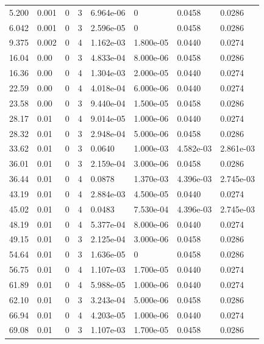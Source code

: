 \documentclass[preview]{standalone}
\begin{document}
{{\begin{tabular}{L{1.2cm}C{1.2cm} C{0.3cm}C{0.5cm} C{1.4cm}C{1.4cm} C{1.4cm}C{1.4cm}}
  5.200  &  0.001  & 0     &  3 &  6.964e-06  & 0  & 0.0458 &  0.0286   \\ 
  6.042  &  0.001  & 0     &  3 &  2.596e-05  & 0  & 0.0458 &  0.0286   \\ 
  9.375  &  0.002  & 0     &  4 &  1.162e-03  & 1.800e-05  & 0.0440 &  0.0274   \\ 
  16.04  &  0.00  & 0     &  3 &  4.833e-04  & 8.000e-06  & 0.0458 &  0.0286   \\ 
  16.36  &  0.00  & 0     &  4 &  1.304e-03  & 2.000e-05  & 0.0440 &  0.0274   \\ 
  22.59  &  0.00  & 0     &  4 &  4.018e-04  & 6.000e-06  & 0.0440 &  0.0274   \\ 
  23.58  &  0.00  & 0     &  3 &  9.440e-04  & 1.500e-05  & 0.0458 &  0.0286   \\ 
  28.17  &  0.01  & 0     &  4 &  9.014e-05  & 1.000e-06  & 0.0440 &  0.0274   \\ 
  28.32  &  0.01  & 0     &  3 &  2.948e-04  & 5.000e-06  & 0.0458 &  0.0286   \\ 
  33.62  &  0.01  & 0     &  3 &  0.0640  & 1.000e-03  & 4.582e-03 &  2.861e-03   \\ 
  36.01  &  0.01  & 0     &  3 &  2.159e-04  & 3.000e-06  & 0.0458 &  0.0286   \\ 
  36.44  &  0.01  & 0     &  4 &  0.0878  & 1.370e-03  & 4.396e-03 &  2.745e-03   \\ 
  43.19  &  0.01  & 0     &  4 &  2.884e-03  & 4.500e-05  & 0.0440 &  0.0274   \\ 
  45.02  &  0.01  & 0     &  4 &  0.0483  & 7.530e-04  & 4.396e-03 &  2.745e-03   \\ 
  48.19  &  0.01  & 0     &  4 &  5.377e-04  & 8.000e-06  & 0.0440 &  0.0274   \\ 
  49.15  &  0.01  & 0     &  3 &  2.125e-04  & 3.000e-06  & 0.0458 &  0.0286   \\ 
  54.64  &  0.01  & 0     &  3 &  1.636e-05  & 0  & 0.0458 &  0.0286   \\ 
  56.75  &  0.01  & 0     &  4 &  1.107e-03  & 1.700e-05  & 0.0440 &  0.0274   \\ 
  61.89  &  0.01  & 0     &  4 &  5.988e-05  & 1.000e-06  & 0.0440 &  0.0274   \\ 
  62.10  &  0.01  & 0     &  3 &  3.243e-04  & 5.000e-06  & 0.0458 &  0.0286   \\ 
  66.94  &  0.01  & 0     &  4 &  4.203e-05  & 1.000e-06  & 0.0440 &  0.0274   \\ 
  69.08  &  0.01  & 0     &  3 &  1.107e-03  & 1.700e-05  & 0.0458 &  0.0286   \\ 

\end{tabular}}}
\end{document}
